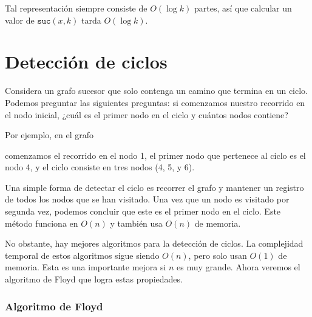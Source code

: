 Tal representación siempre consiste de $O(\log k)$ partes,
así que calcular un valor de $\texttt{suc}(x,k)$ tarda $O(\log k)$.

\section{Detección de ciclos}


Considera un grafo sucesor que solo contenga un camino que termina
en un ciclo. Podemos preguntar las siguientes preguntas: si comenzamos
nuestro recorrido en el nodo inicial, ¿cuál es el primer nodo en el ciclo
y cuántos nodos contiene?

Por ejemplo, en el grafo
\begin{center}
\end{center}

comenzamos el recorrido en el nodo 1, el primer nodo que pertenece
al ciclo es el nodo 4, y el ciclo consiste en tres nodos (4, 5, y 6).

Una simple forma de detectar el ciclo es recorrer el grafo y mantener
un registro de todos los nodos que se han visitado. Una vez que un nodo
es visitado por segunda vez, podemos concluir que este es el primer nodo
en el ciclo. Este método funciona en $O(n)$ y también usa $O(n)$ de memoria.

No obstante, hay mejores algoritmos para la detección de ciclos. La
complejidad temporal de estos algoritmos sigue siendo $O(n)$, pero solo
usan $O(1)$ de memoria. Esta es una importante mejora si $n$ es muy grande.
Ahora veremos el algoritmo de Floyd que logra estas propiedades.

\subsubsection{Algoritmo de Floyd}

